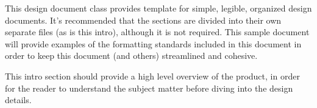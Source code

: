 
This design document class provides template for simple, legible, organized design documents.  It's recommended that the sections are divided into their own separate files (as is this intro), although it is not required.  This sample document will provide examples of the formatting standards included in this document in order to keep this document (and others) streamlined and cohesive.

This intro section should provide a high level overview of the product, in order for the reader to understand the subject matter before diving into the design details.